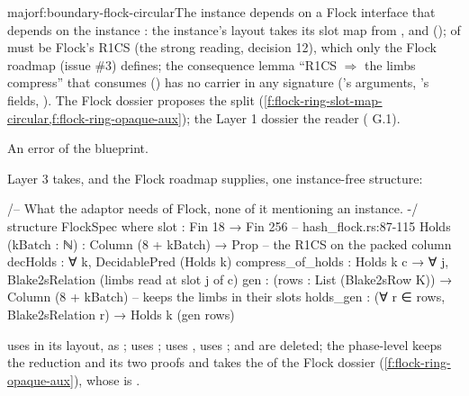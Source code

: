\begin{finding}{major}{f:boundary-flock-circular}{The instance depends on a Flock interface that depends on the instance}
 : the instance's layout takes its slot map from
, and 
();  of  must be Flock's R1CS (the strong reading,
decision 12), which only the Flock roadmap (issue \#3) defines; the consequence lemma
\enquote{R1CS $⇒$ the limbs compress} that  consumes
() has no carrier in any signature ('s arguments,
's fields, ). The Flock dossier proposes the split
(\cref{f:flock-ring-slot-map-circular,f:flock-ring-opaque-aux}); the Layer 1 dossier the reader
( G.1).

 An error of the blueprint.

 Layer 3 takes, and the Flock roadmap supplies, one instance-free
structure:
\begin{leancode}
/-- What the adaptor needs of Flock, none of it mentioning an instance. -/
structure FlockSpec where
  slot : Fin 18 → Fin 256                                   -- hash_flock.rs:87-115
  Holds (kBatch : ℕ) : Column (8 + kBatch) → Prop            -- the R1CS on the packed column
  decHolds : ∀ k, DecidablePred (Holds k)
  compress_of_holds : Holds k c → ∀ j, Blake2sRelation (limbs read at slot j of c)
  gen : (rows : List (Blake2sRow K)) → Column (8 + kBatch)   -- keeps the limbs in their slots
  holds_gen : (∀ r ∈ rows, Blake2sRelation r) → Holds k (gen rows)
\end{leancode}
 uses  in its layout,  as
;  uses ;  uses
,  uses ;  and
 are deleted; the phase-level  keeps the
reduction and its two proofs and takes the  of the Flock dossier
(\cref{f:flock-ring-opaque-aux}), whose  is .
\end{finding}

